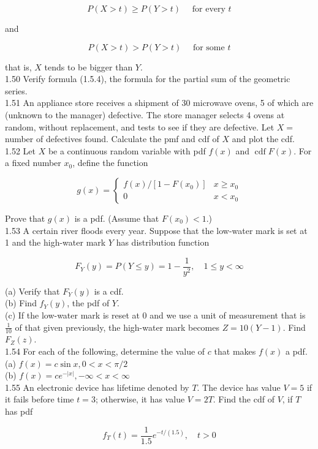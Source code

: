 \documentclass[10pt]{article}
\begin{document}
$$
P(X>t) \geq P(Y>t) \quad \text { for every } t
$$

and

$$
P(X>t)>P(Y>t) \quad \text { for some } t
$$

that is, $X$ tends to be bigger than $Y$.\\
1.50 Verify formula (1.5.4), the formula for the partial sum of the geometric series.\\
1.51 An appliance store receives a shipment of 30 microwave ovens, 5 of which are (unknown to the manager) defective. The store manager selects 4 ovens at random, without replacement, and tests to see if they are defective. Let $X=$ number of defectives found. Calculate the pmf and cdf of $X$ and plot the cdf.\\
1.52 Let $X$ be a continuous random variable with pdf $f(x)$ and $\operatorname{cdf} F(x)$. For a fixed number $x_{0}$, define the function

$$
g(x)= \begin{cases}f(x) /\left[1-F\left(x_{0}\right)\right] & x \geq x_{0} \\ 0 & x<x_{0}\end{cases}
$$

Prove that $g(x)$ is a pdf. (Assume that $F\left(x_{0}\right)<1$.)\\
1.53 A certain river floods every year. Suppose that the low-water mark is set at 1 and the high-water mark $Y$ has distribution function

$$
F_{Y}(y)=P(Y \leq y)=1-\frac{1}{y^{2}}, \quad 1 \leq y<\infty
$$

(a) Verify that $F_{Y}(y)$ is a cdf.\\
(b) Find $f_{Y}(y)$, the pdf of $Y$.\\
(c) If the low-water mark is reset at 0 and we use a unit of measurement that is $\frac{1}{10}$ of that given previously, the high-water mark becomes $Z=10(Y-1)$. Find $F_{Z}(z)$.\\
1.54 For each of the following, determine the value of $c$ that makes $f(x)$ a pdf.\\
(a) $f(x)=c \sin x, 0<x<\pi / 2$\\
(b) $f(x)=c e^{-|x|},-\infty<x<\infty$\\
1.55 An electronic device has lifetime denoted by $T$. The device has value $V=5$ if it fails before time $t=3$; otherwise, it has value $V=2 T$. Find the cdf of $V$, if $T$ has pdf

$$
f_{T}(t)=\frac{1}{1.5} e^{-t /(1.5)}, \quad t>0
$$
\end{document}
